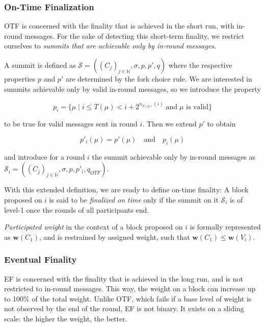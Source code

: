 \subsubsection*{On-Time Finalization}
\label{sec:on-time-finalization}

OTF is concerned with the finality that is achieved in the short run, with in-round messages. For the sake of detecting this short-term finality, we restrict ourselves to \emph{summits that are achievable only by in-round messages}.

A summit is defined as $\mathcal{S}=((C_j)_{j\in\mathbb{N}}, \sigma,p,p',q)$ where the respective properties $p$ and $p'$ are determined by the fork choice rule. We are interested in summits achievable only by valid in-round messages, so we introduce the property

\begin{equation}
  p_i = \{\mu \mid i \leq T(\mu)< i+2^{n_{S(\mu) }(i)}\;\text{and}\;\mu\text{ is valid}\}
\end{equation}

to be true for valid messages sent in round $i$. Then we extend $p'$ to obtain

\begin{equation}
  p'_{i}(\mu) = p'(\mu)\quad\text{and}\quad p_{i}(\mu)
\end{equation}

and introduce for a round $i$ the summit achievable only by in-round messages as $\mathcal{S}_i=((C_j)_{j\in\mathbb{N}}, \sigma,p,p'_{i},q_{OTF})$.

With this extended definition, we are ready to define on-time finality: A block proposed on $i$ is said to be \emph{finalized on time} only if the summit on it $\mathcal{S}_i$ is of level-1 once the rounds of all participants end.

\emph{Participated weight} in the context of a block proposed on $i$ is formally represented as $\boldsymbol{w}(C_1)$, and is restrained by assigned weight, such that $\boldsymbol{w}(C_1) \leq \boldsymbol{w}(V_i)$.

\subsubsection*{Eventual Finality}
\label{sec:eventual-finality}

EF is concerned with the finality that is achieved in the long run, and is not restricted to in-round messages. This way, the weight on a block can increase up to 100\% of the total weight. Unlike OTF, which fails if a base level of weight is not observed by the end of the round, EF is not binary. It exists on a sliding scale: the higher the weight, the better.

